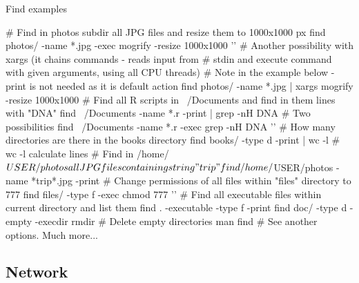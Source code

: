 \documentclass[compress, ucs, xelatex, 11pt, xcolor=svgnames,
  hyperref={
    bookmarks=true,
    unicode=true,
    colorlinks=true,
    pdftitle={Linux, command line and MetaCentrum},
    plainpages=false,
    pdfauthor={Vojtech Zeisek},
    pdfsubject={Course about use of Linux command line, writing shell scripts and using MetaCentrum of CESNET},
    pdfcreator={XeLaTeX},
    pdfkeywords={Linux, GNU, BASH, shell, command line, MetaCentrum},
    linkcolor=DarkRed,
    anchorcolor=DarkBlue,
    citecolor=Indigo,
    filecolor=NavyBlue,
    menucolor=DarkMagenta,
    urlcolor=DarkBlue,
    pdftex},
  url={hyphens, lowtilde} %
  ]{beamer}
\begin{document}
\begin{frame}[fragile]{Find examples}
  \begin{bashcode}
    # Find in photos subdir all JPG files and resize them to 1000x1000 px
    find photos/ -name *.jpg -exec mogrify -resize 1000x1000 '{}' \;
    # Another possibility with xargs (it chains commands - reads input from
    # stdin and execute command with given arguments, using all CPU threads)
    # Note in the example below -print is not needed as it is default action
    find photos/ -name *.jpg | xargs mogrify -resize 1000x1000
    # Find all R scripts in ~/Documents and find in them lines with "DNA"
    find ~/Documents -name *.r -print | grep -nH DNA # Two possibilities
    find ~/Documents -name *.r -exec grep -nH DNA '{}' \;
    # How many directories are there in the books directory
    find books/ -type d -print | wc -l # wc -l calculate lines
    # Find in /home/$USER/photos all JPG files containing string "trip"
    find /home/$USER/photos -name *trip*.jpg -print
    # Change permissions of all files within "files" directory to 777
    find files/ -type f -exec chmod 777 '{}' \;
    # Find all executable files within current directory and list them
    find . -executable -type f -print
    find doc/ -type d -empty -execdir rmdir {} \; # Delete empty directories
    man find # See another options. Much more...
  \end{bashcode}
\end{frame}

\subsection{Network}
\end{document}
